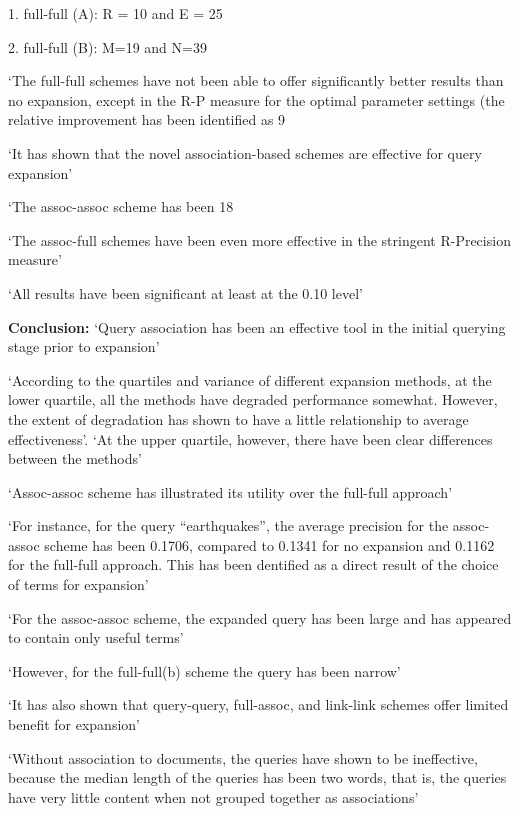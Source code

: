 \documentclass[]{article}
\begin{document}
{{1.	full-full (A): R = 10 and E = 25

2.	full-full (B): M=19 and N=39

‘The full-full schemes have not been able to offer significantly better results than no expansion, except in the R-P measure for the optimal parameter settings (the relative improvement has been identified as 9%

‘It has shown that the novel association-based schemes are effective for query expansion’

‘The assoc-assoc scheme has been 18%

‘The assoc-full schemes have been even more effective in the stringent R-Precision measure’

‘All results have been significant at least at the 0.10 level’

\textbf{Conclusion:} ‘Query association has been an effective tool in the initial querying stage prior to expansion’

‘According to the quartiles and variance of different expansion methods, at the lower quartile, all the methods have degraded performance somewhat. However, the extent of degradation has shown to have a little relationship to average effectiveness’. ‘At the upper quartile, however, there have been clear differences between the methods’

‘Assoc-assoc scheme has illustrated its utility over the full-full approach’

‘For instance, for the query “earthquakes”, the average precision for the assoc-assoc scheme has been 0.1706, compared to 0.1341 for no expansion and 0.1162 for the full-full approach. This has been dentified as a direct result of the choice of terms for expansion’

‘For the assoc-assoc scheme, the expanded query has been large and has appeared to contain only useful terms’

‘However, for the full-full(b) scheme the query has been narrow’

‘It has also shown that query-query, full-assoc, and link-link schemes offer limited benefit for expansion’

‘Without association to documents, the queries have shown to be ineffective, because the median length of the queries has been two words, that is, the queries have very little content when not grouped together as associations’

}}
\end{document}
